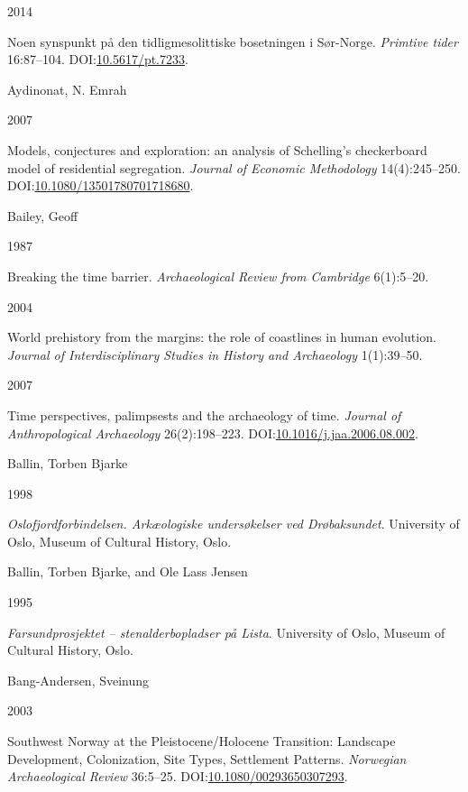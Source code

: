 \documentclass[
  a4paper,
  oneside]{uiophdthesis}
\newlength{\cslhangindent}
\newlength{\csllabelwidth}
\newlength{\cslentryspacingunit} %
\newenvironment{CSLReferences}[2] %
 {%
  \setlength{\parindent}{0pt}
  \ifodd #1
  \let\oldpar\par
  \def\par{\hangindent=\cslhangindent\oldpar}
  \fi
  \setlength{\parskip}{#2\cslentryspacingunit}
 }%
 {}
\newcommand{\CSLBlock}[1]{#1\hfill\break}
\newcommand{\CSLLeftMargin}[1]{\parbox[t]{\csllabelwidth}{#1}}
\newcommand{\CSLRightInline}[1]{\parbox[t]{\linewidth - \csllabelwidth}{#1}\break}
\begin{document}
\begin{CSLReferences}{0}{0}
\leavevmode{}%
\CSLLeftMargin{ 2014 }
\CSLRightInline{{Noen synspunkt på den tidligmesolittiske bosetningen i Sør-Norge}. \emph{Primtive tider} 16:87--104. DOI:\href{https://doi.org/10.5617/pt.7233}{10.5617/pt.7233}.}

\leavevmode{}%
\CSLBlock{Aydinonat, N. Emrah}
\CSLLeftMargin{ 2007}
\CSLRightInline{{Models, conjectures and exploration: an analysis of Schelling's checkerboard model of residential segregation}. \emph{Journal of Economic Methodology} 14(4):245--250. DOI:\href{https://doi.org/10.1080/13501780701718680}{10.1080/13501780701718680}.}

\leavevmode{}%
\CSLBlock{Bailey, Geoff}
\CSLLeftMargin{ 1987}
\CSLRightInline{Breaking the time barrier. \emph{Archaeological Review from Cambridge} 6(1):5--20.}

\leavevmode{}%
\CSLLeftMargin{ 2004 }
\CSLRightInline{World prehistory from the margins: the role of coastlines in human evolution. \emph{Journal of Interdisciplinary Studies in History and Archaeology} 1(1):39--50.}

\leavevmode{}%
\CSLLeftMargin{ 2007 }
\CSLRightInline{Time perspectives, palimpsests and the archaeology of time. \emph{Journal of Anthropological Archaeology} 26(2):198--223. DOI:\href{https://doi.org/10.1016/j.jaa.2006.08.002}{10.1016/j.jaa.2006.08.002}.}

\leavevmode{}%
\CSLBlock{Ballin, Torben Bjarke}
\CSLLeftMargin{ 1998}
\CSLRightInline{\emph{{Oslofjordforbindelsen. Arkæologiske undersøkelser ved Drøbaksundet}}. University of Oslo, Museum of Cultural History, Oslo.}

\leavevmode{}%
\CSLBlock{Ballin, Torben Bjarke, and Ole Lass Jensen}
\CSLLeftMargin{ 1995}
\CSLRightInline{\emph{{Farsundprosjektet -- stenalderbopladser på Lista}}. University of Oslo, Museum of Cultural History, Oslo.}

\leavevmode{}%
\CSLBlock{Bang-Andersen, Sveinung}
\CSLLeftMargin{ 2003}
\CSLRightInline{{Southwest Norway at the Pleistocene/Holocene Transition: Landscape Development, Colonization, Site Types, Settlement Patterns}. \emph{Norwegian Archaeological Review} 36:5--25. DOI:\href{https://doi.org/10.1080/00293650307293}{10.1080/00293650307293}.}


\end{CSLReferences}
\end{document}
